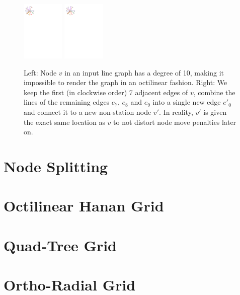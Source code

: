 \documentclass[sigconf]{acmart}
\begin{document}
\begin{figure}
    \centering
	\hfill
	\includegraphics[width=0.18\textwidth]{figures2/nodesplit.pdf}
	\hfill
	\includegraphics[width=0.18\textwidth,page=2]{figures2/nodesplit.pdf}
	\hfill
	\caption{Left: Node $v$ in an input line graph has a degree of 10, making it impossible to render the graph in an octilinear fashion. Right: We keep the first (in clockwise order) 7 adjacent edges of $v$, combine the lines of the remaining edges $e_7$, $e_8$ and $e_9$ into a single new edge $e'_0$ and connect it to a new non-station node $v'$. In reality, $v'$ is given the exact same location as $v$ to not distort node move penalties later on.}
	\label{FIG:orthoradgrid}
\end{figure}

\section{Node Splitting}


\section{Octilinear Hanan Grid}

\section{Quad-Tree Grid}

\section{Ortho-Radial Grid}
\end{document}
